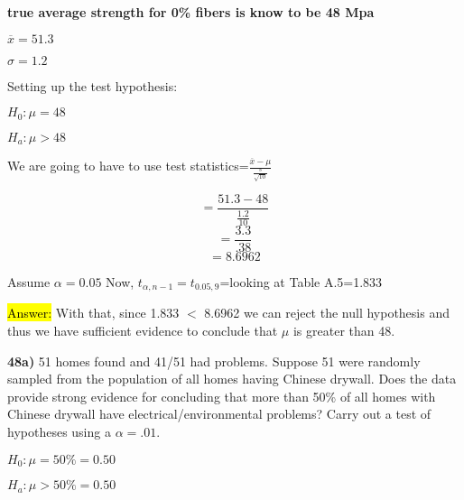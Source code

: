 \documentclass{article}
\begin{document}
\vspace{2mm}

\textbf{true average strength for 0\% fibers is know to be 48 Mpa}

\vspace{2mm}

$\overline{x}=51.3$

\vspace{2mm}

$\sigma=1.2$

\vspace{2mm}

Setting up the test hypothesis: 

\vspace{2mm}

$H_{0}: \mu= 48$ 

\vspace{2mm}

$H_{a}: \mu > 48$

We are going to have to use test statistics=$\frac{\overline{x}-\mu}{\frac{s}{\sqrt{10}}}$

\vspace{2mm}

$$=\frac{51.3-48}{\frac{1.2}{10}}$$
$$=\frac{3.3}{.38}$$
$$=8.6962$$

\vspace{2mm}

Assume $\alpha=0.05$
Now, $t_{\alpha,n-1}=t_{0.05, 9}$=looking at Table A.5=1.833

\vspace{2mm}

\hl{Answer:} With that, since 1.833 $<$ 8.6962 we can reject the null hypothesis and thus  we have sufficient evidence to conclude that $\mu$ is greater than 48. 
				



\newpage
\textbf{48a)} 51 homes found and 41/51 had problems. Suppose 51 were randomly sampled from the population of all homes having Chinese drywall. Does the data provide strong evidence for concluding that more than 50\% of all homes with Chinese drywall have electrical/environmental problems? Carry out a test of hypotheses using a $\alpha= .01$.

\vspace{2mm}

$H_{0}: \mu=50\%=0.50$

\vspace{2mm}

$H_{a}: \mu>50\%=0.50$
\end{document}

